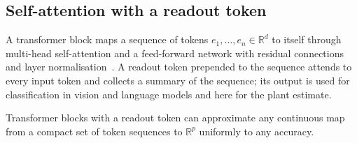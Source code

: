 \subsection{Self-attention with a readout token}
A transformer block maps a sequence of tokens $e_1,\dots,e_n\in\mathbb R^d$ to itself through multi-head self-attention and a feed-forward network with residual connections and layer normalisation~\cite{Vaswani2017}. A readout token prepended to the sequence attends to every input token and collects a summary of the sequence; its output is used for classification in vision and language models and here for the plant estimate.
\begin{fact}\label{fact:ua}
Transformer blocks with a readout token can approximate any continuous map from a compact set of token sequences to $\mathbb R^p$ uniformly to any accuracy.
\end{fact}
